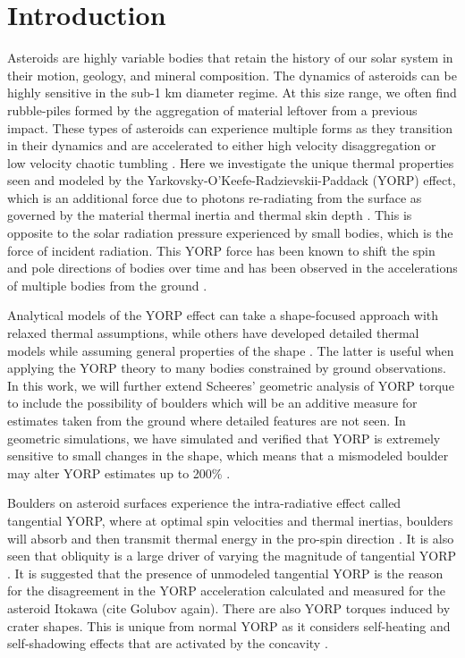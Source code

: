 \documentclass[12pt,notitlepage]{article}
\begin{document}
\section{Introduction} \label{introduction} %
Asteroids are highly variable bodies that retain the history of our solar system in their motion, geology, and mineral composition. The dynamics of asteroids can be highly sensitive in the sub-1 km diameter regime. At this size range, we often find rubble-piles formed by the aggregation of material leftover from a previous impact. These types of asteroids can experience multiple forms as they transition in their dynamics and are accelerated to either high velocity disaggregation or low velocity chaotic tumbling \cite{Golubov2019}. 
Here we investigate the unique thermal properties seen and modeled by the Yarkovsky-O'Keefe-Radzievskii-Paddack (YORP) effect, which is an additional force due to photons re-radiating from the surface as governed by the material thermal inertia and thermal skin depth \cite{Rubincam2000}\cite{Davidsson2014}. This is opposite to the solar radiation pressure experienced by small bodies, which is the force of incident radiation. This YORP force has been known to shift the spin and pole directions of bodies over time and has been observed in the accelerations of multiple bodies from the ground \cite{Durech2023}\cite{Lowry2007}. 


Analytical models of the YORP effect can take a shape-focused approach with relaxed thermal assumptions, while others have developed detailed thermal models while assuming general properties of the shape \cite{Scheeres2007}\cite{Nesvorny2008}. The latter is useful when applying the YORP theory to many bodies constrained by ground observations. In this work, we will further extend Scheeres' geometric analysis of YORP torque to include the possibility of boulders which will be an additive measure for estimates taken from the ground where detailed features are not seen. In geometric simulations, we have simulated and verified that YORP is extremely sensitive to small changes in the shape, which means that a mismodeled boulder may alter YORP estimates up to 200\% \cite{Baker2024} \cite{Statler2009}. 

Boulders on asteroid surfaces experience the intra-radiative effect called tangential YORP, where at optimal spin velocities and thermal inertias, boulders will absorb and then transmit thermal energy in the pro-spin direction \cite{Golubov2022}. It is also seen that obliquity is a large driver of varying the magnitude of tangential YORP \cite{Sevecek2016}. It is suggested that the presence of unmodeled tangential YORP is the reason for the disagreement in the YORP acceleration calculated and measured for the asteroid Itokawa (cite Golubov again). There are also YORP torques induced by crater shapes. This is unique from normal YORP as it considers self-heating and self-shadowing effects that are activated by the concavity \cite{Zhou2023}.
\end{document}
